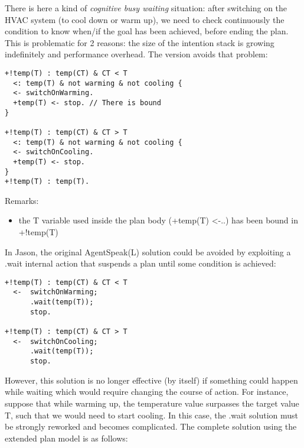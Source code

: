   \noindent There is here a kind of \emph{cognitive busy waiting}
  situation: after switching on the HVAC system (to cool down or warm
  up), we need to check continuously the condition to
  know when/if the goal has been achieved, before ending the plan.
%
  This is problematic for 2 reasons: the size of the intention stack
  is growing indefinitely and performance overhead.
%
The \aser version avoids that problem:

{\small
\begin{verbatim}
+!temp(T) : temp(CT) & CT < T 
  <: temp(T) & not warming & not cooling {  
  <- switchOnWarming.
  +temp(T) <- stop. // There is bound
}

+!temp(T) : temp(CT) & CT > T 
  <: temp(T) & not warming & not cooling {  
  <- switchOnCooling.	
  +temp(T) <- stop.		
}
+!temp(T) : temp(T).
\end{verbatim}}


Remarks:
\begin{itemize}
\item the T variable used inside the plan body (+temp(T) <-..) has been bound in +!temp(T)
\end{itemize}

\noindent  In Jason, the original AgentSpeak(L) solution could be avoided  by exploiting a .wait internal action that suspends a plan until some condition is achieved:

{\small
\begin{verbatim}
+!temp(T) : temp(CT) & CT < T 
  <-  switchOnWarming;
      .wait(temp(T));
      stop.

+!temp(T) : temp(CT) & CT > T 
  <-  switchOnCooling;
      .wait(temp(T));
      stop.
\end{verbatim}}

  \noindent However, this solution is no longer effective (by itself)
  if something could happen while waiting which would require changing
  the course of action.
%
  For instance, suppose that while warming up, the temperature value
  surpasses the target value T, such that we would need to start
  cooling. In this case, the .wait solution must be strongly reworked
  and becomes complicated.
%
The complete solution using the extended plan model is as follows:

